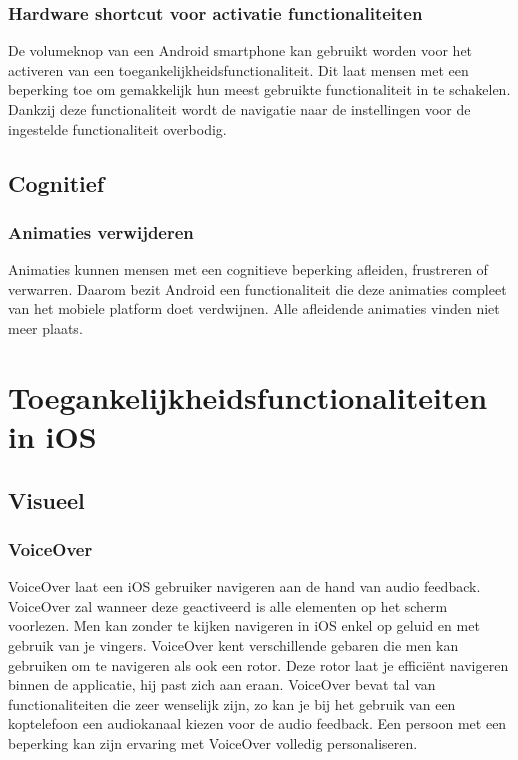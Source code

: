 \subsubsection{Hardware shortcut voor activatie functionaliteiten}
De volumeknop van een Android smartphone kan gebruikt worden voor het activeren van een toegankelijkheidsfunctionaliteit. Dit laat mensen met een beperking toe om gemakkelijk hun meest gebruikte functionaliteit in te schakelen. Dankzij deze functionaliteit wordt de navigatie naar de instellingen voor de ingestelde functionaliteit overbodig.
\subsection{Cognitief}
 
\subsubsection{Animaties verwijderen}
Animaties kunnen mensen met een cognitieve beperking afleiden, frustreren of verwarren. Daarom bezit Android een functionaliteit die deze animaties compleet van het mobiele platform doet verdwijnen. Alle afleidende animaties vinden niet meer plaats.

\section{Toegankelijkheidsfunctionaliteiten in iOS}
\label{sec:ToegankelijkheidsfunctionaliteiteniOS}
\subsection{Visueel}

\subsubsection{VoiceOver}
\label{subsec:VoiceOver}
VoiceOver laat een iOS gebruiker navigeren aan de hand van audio feedback. VoiceOver zal wanneer deze geactiveerd is alle elementen op het scherm voorlezen. Men kan zonder te kijken navigeren in iOS enkel op geluid en met gebruik van je vingers. VoiceOver kent verschillende gebaren die men kan gebruiken om te navigeren als ook een rotor. Deze rotor laat je efficiënt navigeren binnen de applicatie, hij past zich aan eraan. VoiceOver bevat tal van functionaliteiten die zeer wenselijk zijn, zo kan je bij het gebruik van een koptelefoon een audiokanaal kiezen voor de audio feedback. Een persoon met een beperking kan zijn ervaring met VoiceOver volledig personaliseren.

